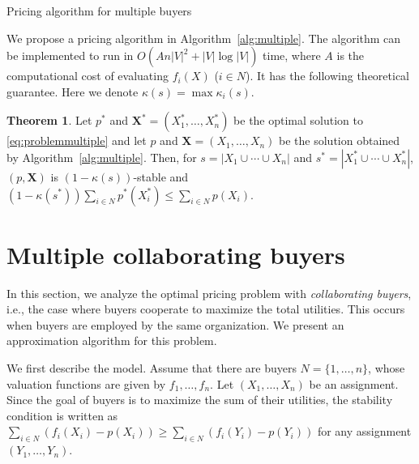 \documentclass[letterpaper]{article}
\theoremstyle{definition}
\newtheorem{theorem}{Theorem}
\begin{document}
\begin{algorithm}[tb]
\caption{Pricing algorithm for multiple buyers}
\label{alg:multiple}
\begin{algorithmic}
\end{algorithmic}
\end{algorithm}
We propose a pricing algorithm in Algorithm~\ref{alg:multiple}.
The algorithm can be implemented to run in $O(A n |V|^2 + |V| \log |V|)$ time,
where $A$ is the computational cost of evaluating $f_i(X)$ ($i \in N$).
It has the following theoretical guarantee.
Here we denote \(\kappa(s)=\max \kappa_i(s)\).
\begin{theorem}
\label{thm:multiplepricing}
Let $p^*$ and $\mathbf{X}^*=(X_1^*, \ldots, X_n^*)$ be the optimal solution to \eqref{eq:problemmultiple}
and let $p$ and $\mathbf{X}=(X_1, \ldots, X_n)$ be the solution obtained by Algorithm~\ref{alg:multiple}.
Then, for $s = |X_1 \cup \cdots \cup X_n|$ and $s^* = |X_1^* \cup \cdots \cup X_n^*|$,
\((p,\mathbf{X})\) is $(1-\kappa(s))$-stable and 
$  (1 - \kappa(s^*)) \sum_{i\in N} p^*(X_i^*) \le \sum_{i\in N} p(X_i)$.
\end{theorem}


\section{Multiple collaborating buyers}
\label{sec:collaborate}

In this section, we analyze the optimal pricing problem with \emph{collaborating buyers}, i.e., the case where buyers cooperate to maximize the total utilities.
This occurs when buyers are employed by the same organization.
We present an approximation algorithm for this problem. 

We first describe the model. 
Assume that there are buyers $N = \{1, \ldots, n\}$, whose valuation functions are given by $f_1, \ldots, f_n$. 
Let $(X_1, \ldots, X_n)$ be an assignment. 
Since the goal of buyers is to maximize the sum of their utilities, the stability condition is written as
$\sum_{i\in N}(f_i(X_i)-p(X_i)) \ge \sum_{i\in N}(f_i(Y_i)-p(Y_i))$ for any assignment $(Y_1, \ldots, Y_n)$. 
\end{document}
